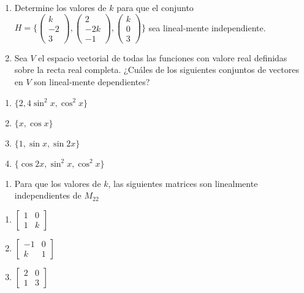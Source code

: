 \documentclass[
  11,
]{article}
\providecommand{\tightlist}{%
  \setlength{\itemsep}{0pt}\setlength{\parskip}{0pt}}
\begin{document}
\begin{enumerate}
\def\labelenumi{\arabic{enumi}.}
\item
  Determine los valores de \(k\) para que el conjunto
  \(H = \{\begin{pmatrix}k \\ -2 \\3 \end{pmatrix}, \begin{pmatrix}2 \\ -2k \\ -1\end{pmatrix}, \begin{pmatrix}k \\ 0 \\3\end{pmatrix}\}\)
  sea lineal-mente independiente.
\item
  Sea \(V\) el espacio vectorial de todas las funciones con valore real
  definidas sobre la recta real completa. ¿Cuáles de los siguientes
  conjuntos de vectores en \(V\) son lineal-mente dependientes?
\end{enumerate}

\begin{enumerate}
\def\labelenumi{\alph{enumi})}
\item
  \(\{2,4\sin^2{x},\cos^2{x}\}\)
\item
  \(\{x, \cos{x}\}\)
\item
  \(\{1,\sin{x},\sin{2x}\}\)
\item
  \(\{\cos{2x}, \sin^2{x}, \cos^2{x}\}\)
\end{enumerate}

\begin{enumerate}
\def\labelenumi{\arabic{enumi}.}
\setcounter{enumi}{2}
\tightlist
\item
  Para que los valores de \(k\), las siguientes matrices son linealmente
  independientes de \(M_  {22}\)
\end{enumerate}

\begin{enumerate}
\def\labelenumi{\alph{enumi})}
\item
  \(\begin{bmatrix}1 & 0\\ 1 & k\end{bmatrix}\)
\item
  \(\begin{bmatrix}-1 & 0 \\ k & 1\end{bmatrix}\)
\item
  \(\begin{bmatrix}2 & 0 \\ 1 & 3\end{bmatrix}\)
\end{enumerate}
\end{document}
